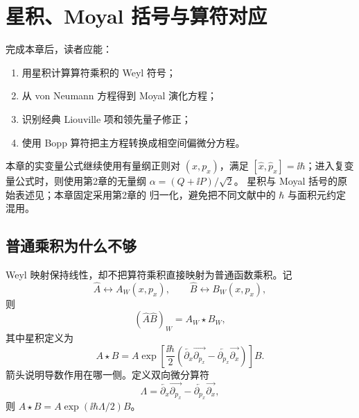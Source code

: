 \chapter{星积、Moyal 括号与算符对应}
\label{ch:moyal}

\begin{learningobjectives}
完成本章后，读者应能：
\begin{enumerate}
  \item 用星积计算算符乘积的 Weyl 符号；
  \item 从 von Neumann 方程得到 Moyal 演化方程；
  \item 识别经典 Liouville 项和领先量子修正；
  \item 使用 Bopp 算符把主方程转换成相空间偏微分方程。
\end{enumerate}
\end{learningobjectives}

本章的实变量公式继续使用有量纲正则对 $(x,p_x)$，满足 $[\hat x,\hat p_x]=\ii\hbar$；进入复变量公式时，则使用第2章的无量纲 $\alpha=(Q+\ii P)/\sqrt2$。
星积与 Moyal 括号的原始表述见\cite{Moyal1949}；本章固定采用第2章的
归一化，避免把不同文献中的 $\hbar$ 与面积元约定混用。

\section{普通乘积为什么不够}

Weyl 映射保持线性，却不把算符乘积直接映射为普通函数乘积。记
\begin{equation*}
  \hat A\leftrightarrow A_W(x,p_x),
  \qquad
  \hat B\leftrightarrow B_W(x,p_x),
\end{equation*}
则
\begin{equation}
  (\hat A\hat B)_W=A_W\star B_W,
  \label{eq:star-product-correspondence}
\end{equation}
其中星积定义为
\begin{equation}
  A\star B
  =A\exp\!\left[
  \frac{\ii\hbar}{2}
  \left(
  \overleftarrow{\partial_x}\overrightarrow{\partial_{p_x}}
  -\overleftarrow{\partial_{p_x}}\overrightarrow{\partial_x}
  \right)\right]B.
  \label{eq:star-product}
\end{equation}
箭头说明导数作用在哪一侧。定义双向微分算符
\begin{equation}
  \Lambda=
  \overleftarrow{\partial_x}\overrightarrow{\partial_{p_x}}
  -\overleftarrow{\partial_{p_x}}\overrightarrow{\partial_x},
\end{equation}
则 $A\star B=A\exp(\ii\hbar\Lambda/2)B$。

